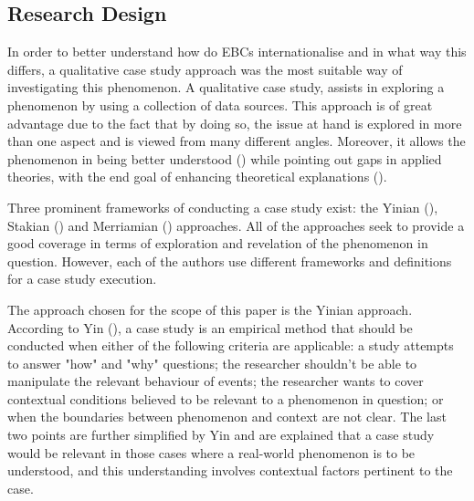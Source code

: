 \documentclass[11pt,a4paper]{article}
\begin{document}
{{%



\subsection{Research Design}
In order to better understand how do EBCs internationalise and in what way this differs, a qualitative case study approach was the most suitable way of investigating this phenomenon. A qualitative case study, assists in exploring a phenomenon by using a collection of data sources. This approach is of great advantage due to the fact that by doing so, the issue at hand is explored in more than one aspect and is viewed from many different angles. Moreover, it allows the phenomenon in being better understood (\cite{baxterQualitativeCaseStudy2008}) while pointing out gaps in applied theories, with the end goal of enhancing theoretical explanations (\cite{ridderCaseStudyResearch2019}). \par
Three prominent frameworks of conducting a case study exist: the Yinian (\citeyear{yinCaseStudyResearch2017}), Stakian (\citeyear{stakeArtCaseStudy1995}) and Merriamian (\citeyear{merriamQualitativeResearchCase1998}) approaches. All of the approaches seek to provide a good coverage in terms of exploration and revelation of the phenomenon in question. However, each of the authors use different frameworks and definitions for a case study execution. \par 
The approach chosen for the scope of this paper is the Yinian approach. According to Yin (\citeyear{yinCaseStudyResearch2017}), a case study is an empirical method that should be conducted when either of the following criteria are applicable: a study attempts to answer "how" and "why" questions; the researcher shouldn't be able to manipulate the relevant behaviour of events; the researcher wants to cover contextual conditions believed to be relevant to a phenomenon in question; or when the boundaries between phenomenon and context are not clear. The last two points are further simplified by Yin and are explained that a case study would be relevant in those cases where a real-world phenomenon is to be understood, and this understanding involves contextual factors pertinent to the case. \par
}}
\end{document}
